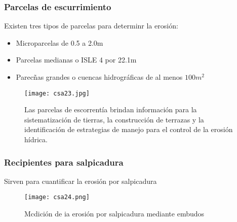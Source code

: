    \subsubsection{Parcelas de escurrimiento}
    Existen tres tipos de parcelas para determinr la erosión:
    \begin{itemize}
        \item Microparcelas de 0.5 a 2.0m
        \item Parcelas medianas o ISLE 4 por 22.1m
        \item Parecñas grandes o cuencas hidrográficas de al menos $100m^2$
    \end{itemize}
    \begin{figure}[h!]
    \centering
      \texttt{[image: csa23.jpg]}
      \caption{Las parcelas de escorrentía brindan información para la sistematización de tierras, la construcción de terrazas y la identificación de estrategias de manejo para el control de la erosión hídrica.}
      \label{csa23}
    \end{figure}
    \subsubsection{Recipientes para salpicadura}
    Sirven para cuantificar la erosión por salpicadura
    \begin{figure}[h!]
    \centering
      \texttt{[image: csa24.png]}
      \caption{Mcdición de ia erosión por salpicadura mediante embudos\cite{pelaez2003metodos}}
      \label{csa24}
    \end{figure}
